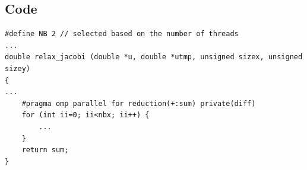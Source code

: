 \documentclass[a4paper,12pt]{article}
\begin{document}
\subsection{Code}
\begin{verbatim}
#define NB 2 // selected based on the number of threads
...
double relax_jacobi (double *u, double *utmp, unsigned sizex, unsigned sizey)
{
...
    #pragma omp parallel for reduction(+:sum) private(diff)
    for (int ii=0; ii<nbx; ii++) {
        ...
    }
    return sum;
}
\end{verbatim}

\newpage
\nocite{*}

\end{document}
